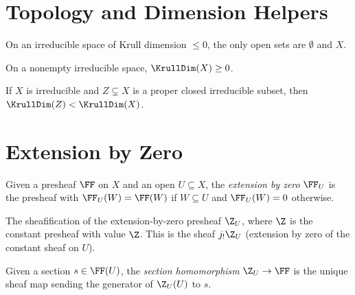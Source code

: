 \chapter{Topology and Dimension Helpers}\label{ch:auxiliary}

\begin{lemma}\label{lem:opens_eq_bot_or_top}
  \leanok
  On an irreducible space of Krull dimension $\le 0$, the only open sets
  are $\emptyset$ and $X$.
\end{lemma}

\begin{lemma}\label{lem:dim_nonneg_irreducible}
  \leanok
  On a nonempty irreducible space, $\KrullDim(X) \ge 0$.
\end{lemma}

\begin{lemma}\label{lem:dim_lt_of_closed}
  \leanok
  If $X$ is irreducible and $Z \subsetneq X$ is a proper closed irreducible subset,
  then $\KrullDim(Z) < \KrullDim(X)$.
\end{lemma}


\chapter{Extension by Zero}\label{ch:zeroOutside}

\begin{definition}\label{def:zeroOutside}
  \leanok
  Given a presheaf $\FF$ on $X$ and an open $U \subseteq X$, the
  \emph{extension by zero} $\FF_U$ is the presheaf with
  $\FF_U(W) = \FF(W)$ if $W \subseteq U$ and $\FF_U(W) = 0$ otherwise.
\end{definition}

\begin{definition}\label{def:zeroOutsideInt}
  \leanok
  The sheafification of the extension-by-zero presheaf $\Z_U$, where
  $\Z$ is the constant presheaf with value $\Z$.
  This is the sheaf $j_! \Z_U$ (extension by zero of the constant sheaf
  on $U$).
\end{definition}

\begin{definition}\label{def:sHom}
  \leanok
  Given a section $s \in \FF(U)$, the \emph{section homomorphism}
  $\Z_U \to \FF$ is the unique sheaf map sending the generator of $\Z_U(U)$ to $s$.
\end{definition}

